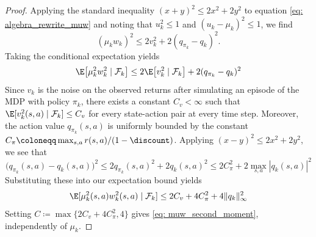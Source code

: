 \begin{proof}
Applying the standard inequality $(x+y)^2 \le 2x^2 + 2y^2$ to equation \eqref{eq: algebra_rewrite_muw}
and noting that $u_k^2 \le 1$ and $(u_k-\mu_k)^2 \le 1$, we find
\[
(\mu_k w_k)^2 \le 2v_k^2 + 2(q_{\pi_k}-q_k)^2 .
\]
Taking the conditional expectation yields
\[
\E\!\left[\mu_k^2 w_k^2 \mid \mathcal F_k\right] \le 2\E\!\left[v_k^2 \mid \mathcal F_k\right] + 2(q_{\pi_k}-q_k)^2
\]
Since $v_k$ is the noise on the observed returns after simulating an episode of the MDP with policy $\pi_k$,
there exists a constant $C_v<\infty$ such that $\E[v_k^2(s,a) \mid \mathcal F_k] \le C_v$ for every state-action pair at every time step. 
Moreover, the action value $q_{\pi_k}(s,a)$ is uniformly bounded by the constant $C_\pi \coloneqq \max_{s,a} r(s,a)/(1-\discount)$. Applying $(x-y)^2 \le 2x^2 + 2y^2$, we see that
\[
\big( q_{\pi_k}(s,a) - q_k(s,a) \big)^2 \le 2 q_{\pi_k}(s,a)^2 + 2 q_k(s,a)^2 \le 2C_\pi^2 + 2 \max_{s,a} |q_k(s,a)|^2
\]
Substituting these into our expectation bound yields
\[
\E [ \mu_k^2(s,a) w_k^2(s,a) \mid \mathcal F_k ] \le 2C_v + 4C_\pi^2 + 4\|q_k\|_\infty^2
\]
Setting $C \coloneqq \max \{ 2C_v + 4C_\pi^2, 4\}$ gives \eqref{eq: muw_second_moment},
independently of $\mu_k$.



\end{proof}
